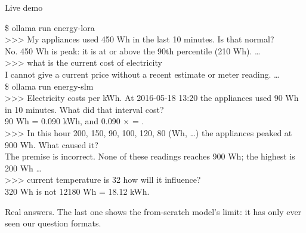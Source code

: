 \documentclass[aspectratio=169,11pt]{beamer}
\newcommand{\speaker}[1]{\gdef\thespeaker{#1}}\gdef\thespeaker{}
\newcommand{\terminal}[1]{\colorbox{term}{\parbox{0.97\linewidth}{\color{white}\ttfamily\scriptsize #1}}}
\newcommand{\tq}[1]{{\color{termq}>>> #1}}
\begin{document}
\speaker{Speaker A}
\begin{frame}{Live demo}
  \terminal{%
    \$ ollama run energy-lora\\
    \tq{My appliances used 450 Wh in the last 10 minutes. Is that normal?}\\
    No. 450 Wh is peak: it is at or above the 90th percentile (210 Wh). \dots\\[0.35em]
    \tq{what is the current cost of electricity}\\
    I cannot give a current price without a recent estimate or meter reading. \dots\\[0.6em]
    \$ ollama run energy-slm\\
    \tq{Electricity costs \texteuro 0.35 per kWh. At 2016-05-18 13:20 the appliances used 90 Wh in 10 minutes. What did that interval cost?}\\
    90 Wh = 0.090 kWh, and 0.090 $\times$ \texteuro 0.35 = \texteuro 0.0315.\\[0.35em]
    \tq{In this hour 200, 150, 90, 100, 120, 80 (Wh, \dots) the appliances peaked at 900 Wh. What caused it?}\\
    The premise is incorrect. None of these readings reaches 900 Wh; the highest is 200 Wh \dots\\[0.35em]
    \tq{current temperature is 32 how will it influence?}\\
    {\color{bad}320 Wh is not 12180 Wh = 18.12 kWh.}}
  \vspace{0.5em}

  \small Real answers. The last one shows the from-scratch model's limit: it has only ever seen our question formats.
\end{frame}
\end{document}

